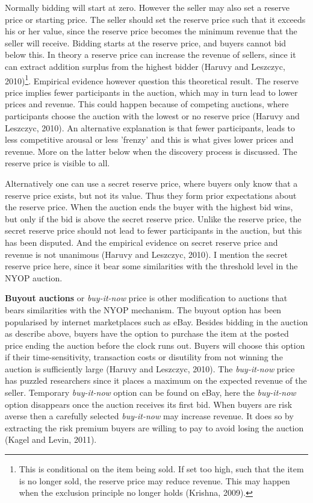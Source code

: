 \documentclass[a4paper,12pt]{article}
\begin{document}
	Normally bidding will start at zero. However the seller may also set a reserve price or starting price. The seller should set the reserve price such that it exceeds his or her value, since the reserve price becomes the minimum revenue that the seller will receive. Bidding starts at the reserve price, and buyers cannot bid below this. In theory a reserve price can increase the revenue of sellers, since it can extract addition surplus from the highest bidder (Haruvy and Leszczyc, 2010)\footnote{This is conditional on the item being sold. If set too high, such that the item is no longer sold, the reserve price may reduce revenue. This may happen when the exclusion principle no longer holds (Krishna, 2009).}. Empirical evidence however question this theoretical result. The reserve price implies fewer participants in the auction, which may in turn lead to lower prices and revenue. This could happen because of competing auctions, where participants choose the auction with the lowest or no reserve price (Haruvy and Leszczyc, 2010). An alternative explanation is that fewer participants, leads to less competitive arousal or less 'frenzy' and this is what gives lower prices and revenue. More on the latter below when the discovery process is discussed. The reserve price is visible to all. 

	Alternatively one can use a secret reserve price, where buyers only know that a reserve price exists, but not its value. Thus they form prior expectations about the reserve price. When the auction ends the buyer with the highest bid wins, but only if the bid is above the secret reserve price. Unlike the reserve price, the secret reserve price should not lead to fewer participants in the auction, but this has been disputed. And the empirical evidence on secret reserve price and revenue is not unanimous (Haruvy and Leszczyc, 2010). I mention the secret reserve price here, since it bear some similarities with the threshold level in the NYOP auction.

	{\bf Buyout auctions} or {\it buy-it-now} price is other modification to auctions that bears similarities with the NYOP mechanism. The buyout option has been popularised by internet marketplaces such as eBay. Besides bidding in the auction as describe above, buyers have the option to purchase the item at the posted price ending the auction before the clock runs out. Buyers will choose this option if their time-sensitivity, transaction costs or disutility from not winning the auction is sufficiently large (Haruvy and Leszczyc, 2010). The {\it buy-it-now} price has puzzled researchers since it places a maximum on the expected revenue of the seller. Temporary {\it buy-it-now} option can be found on eBay, here the {\it buy-it-now} option disappears once the auction receives its first bid. When buyers are risk averse then a carefully selected {\it buy-it-now} may increase revenue. It does so by extracting the risk premium buyers are willing to pay to avoid losing the auction (Kagel and Levin, 2011).
\end{document}
